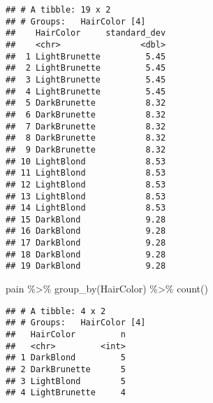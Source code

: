 \documentclass[
]{article}
\newenvironment{Shaded}{\begin{snugshade}}{\end{snugshade}}
\newcommand{\FunctionTok}[1]{\textcolor[rgb]{0.00,0.00,0.00}{#1}}
\newcommand{\NormalTok}[1]{#1}
\newcommand{\SpecialCharTok}[1]{\textcolor[rgb]{0.00,0.00,0.00}{#1}}
\begin{document}
\begin{verbatim}
## # A tibble: 19 x 2
## # Groups:   HairColor [4]
##    HairColor     standard_dev
##    <chr>                <dbl>
##  1 LightBrunette         5.45
##  2 LightBrunette         5.45
##  3 LightBrunette         5.45
##  4 LightBrunette         5.45
##  5 DarkBrunette          8.32
##  6 DarkBrunette          8.32
##  7 DarkBrunette          8.32
##  8 DarkBrunette          8.32
##  9 DarkBrunette          8.32
## 10 LightBlond            8.53
## 11 LightBlond            8.53
## 12 LightBlond            8.53
## 13 LightBlond            8.53
## 14 LightBlond            8.53
## 15 DarkBlond             9.28
## 16 DarkBlond             9.28
## 17 DarkBlond             9.28
## 18 DarkBlond             9.28
## 19 DarkBlond             9.28
\end{verbatim}

\begin{Shaded}
\begin{Highlighting}[]
\NormalTok{pain }\SpecialCharTok{\%\textgreater{}\%}
  \FunctionTok{group\_by}\NormalTok{(HairColor) }\SpecialCharTok{\%\textgreater{}\%}
  \FunctionTok{count}\NormalTok{()}
\end{Highlighting}
\end{Shaded}

\begin{verbatim}
## # A tibble: 4 x 2
## # Groups:   HairColor [4]
##   HairColor         n
##   <chr>         <int>
## 1 DarkBlond         5
## 2 DarkBrunette      5
## 3 LightBlond        5
## 4 LightBrunette     4
\end{verbatim}
\end{document}
